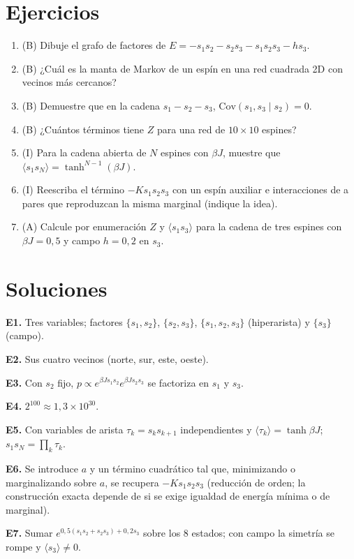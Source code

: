 \documentclass[11pt,a4paper]{article}
\begin{document}
\section{Ejercicios}
\begin{enumerate}[label=\textbf{E\arabic*.}]
\item (B) Dibuje el grafo de factores de $E=-s_1s_2-s_2s_3-s_1s_2s_3-hs_3$.
\item (B) ¿Cuál es la manta de Markov de un espín en una red cuadrada 2D con vecinos más cercanos?
\item (B) Demuestre que en la cadena $s_1-s_2-s_3$, $\mathrm{Cov}(s_1,s_3\mid s_2)=0$.
\item (B) ¿Cuántos términos tiene $Z$ para una red de $10\times10$ espines?
\item (I) Para la cadena abierta de $N$ espines con $\beta J$, muestre que $\langle s_1s_N\rangle=\tanh^{N-1}(\beta J)$.
\item (I) Reescriba el término $-Ks_1s_2s_3$ con un espín auxiliar e interacciones de a pares que reproduzcan la misma marginal (indique la idea).
\item (A) Calcule por enumeración $Z$ y $\langle s_1s_3\rangle$ para la cadena de tres espines con $\beta J=0{,}5$ y campo $h=0{,}2$ en $s_3$.
\end{enumerate}
\section{Soluciones}
\begin{solucion}
\textbf{E1.} Tres variables; factores $\{s_1,s_2\}$, $\{s_2,s_3\}$, $\{s_1,s_2,s_3\}$ (hiperarista) y $\{s_3\}$ (campo).

\textbf{E2.} Sus cuatro vecinos (norte, sur, este, oeste).

\textbf{E3.} Con $s_2$ fijo, $p\propto e^{\beta Js_1s_2}e^{\beta Js_2s_3}$ se factoriza en $s_1$ y $s_3$.

\textbf{E4.} $2^{100}\approx1{,}3\times10^{30}$.

\textbf{E5.} Con variables de arista $\tau_k=s_ks_{k+1}$ independientes y $\langle\tau_k\rangle=\tanh\beta J$; $s_1s_N=\prod_k\tau_k$.

\textbf{E6.} Se introduce $a$ y un término cuadrático tal que, minimizando o marginalizando sobre $a$, se recupera $-Ks_1s_2s_3$ (reducción de orden;
la construcción exacta depende de si se exige igualdad de energía mínima o de marginal).

\textbf{E7.} Sumar $e^{0{,}5(s_1s_2+s_2s_3)+0{,}2s_3}$ sobre los 8 estados; con campo la simetría se rompe y $\langle s_3\rangle\neq0$.
\end{solucion}
\end{document}
